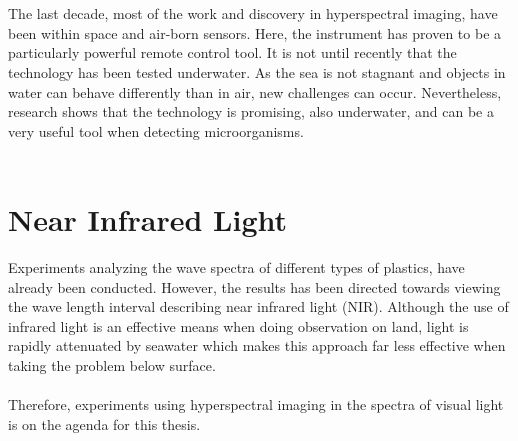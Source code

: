 \\\\
The last decade, most of the work and discovery in hyperspectral imaging, have been within space and air-born sensors. Here, the instrument has proven to be a particularly powerful remote control tool. It is not until recently that the technology has been tested underwater. As the sea is not stagnant and objects in water can behave differently than in air, new challenges can occur. Nevertheless, research shows that the technology is promising, also underwater, and can be a very useful tool when detecting microorganisms.
\\\\

\section{Near Infrared Light}


Experiments analyzing the wave spectra of different types of plastics, have already been conducted. However, the results has been directed towards viewing the wave length interval describing near infrared light (NIR). Although the use of infrared light is an effective means when doing observation on land, light is rapidly attenuated by seawater which makes this approach far less effective when taking the problem below surface.
\\\\
Therefore, experiments using hyperspectral imaging in the spectra of visual light is on the agenda for this thesis. 
\\\\
